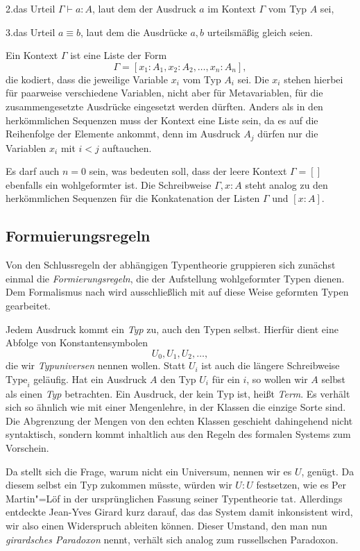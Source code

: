 2.\;das Urteil $\Gamma\vdash a\colon A$, laut dem der Ausdruck
$a$ im Kontext $\Gamma$ vom Typ $A$ sei,

3.\;das Urteil $a\equiv b$, laut dem die Ausdrücke
$a,b$ urteilsmäßig gleich seien.

Ein Kontext $\Gamma$ ist eine Liste der Form
\[\Gamma = [x_1\colon A_1,x_2\colon A_2,\ldots,x_n\colon A_n],\]
die kodiert, dass die jeweilige Variable $x_i$ vom Typ $A_i$ sei. Die $x_i$
stehen hierbei für paarweise verschiedene Variablen, nicht aber für
Metavariablen, für die zusammengesetzte Ausdrücke eingesetzt werden
dürften. Anders als in den herkömmlichen Sequenzen muss der Kontext
eine Liste sein, da es auf die Reihenfolge der Elemente ankommt, denn
im Ausdruck $A_j$ dürfen nur die Variablen $x_i$ mit $i<j$ auftauchen.

Es darf auch $n=0$ sein, was bedeuten soll, dass der leere Kontext
$\Gamma=[]$ ebenfalls ein wohlgeformter ist. Die Schreibweise
$\Gamma,x\colon A$ steht analog zu den herkömmlichen Sequenzen für die
Konkatenation der Listen $\Gamma$ und $[x\colon A]$.

\subsection{Formuierungsregeln}

Von den Schlussregeln der abhängigen Typentheorie gruppieren sich
zunächst einmal die \emph{Formierungsregeln}, die der Aufstellung
wohlgeformter Typen dienen. Dem Formalismus nach wird ausschließlich
mit auf diese Weise geformten Typen gearbeitet.

Jedem Ausdruck kommt ein \emph{Typ} zu, auch den Typen selbst. Hierfür
dient eine Abfolge von Konstantensymbolen
\[U_0,U_1,U_2,\ldots,\]
die wir \emph{Typuniversen} nennen wollen. Statt $U_i$ ist auch die
längere Schreibweise $\mathrm{Type}_i$ geläufig. Hat ein Ausdruck $A$ den
Typ $U_i$ für ein $i$, so wollen wir $A$ selbst als einen \emph{Typ}
betrachten. Ein Ausdruck, der kein Typ ist, heißt \emph{Term}.
Es verhält sich so ähnlich wie mit einer Mengenlehre, in der Klassen
die einzige Sorte sind. Die Abgrenzung der Mengen von den echten Klassen
geschieht dahingehend nicht syntaktisch, sondern kommt inhaltlich aus
den Regeln des formalen Systems zum Vorschein.

Da stellt sich die Frage, warum nicht ein Universum, nennen wir es $U$,
genügt. Da diesem selbst ein Typ zukommen müsste, würden wir $U\colon U$
festsetzen, wie es Per Martin"=Löf in der ursprünglichen Fassung seiner
Typentheorie tat. Allerdings entdeckte Jean-Yves Girard kurz darauf, das
das System damit inkonsistent wird, wir also einen Widerspruch ableiten
können. Dieser Umstand, den man nun \emph{girardsches Paradoxon}
nennt, verhält sich analog zum russellschen Paradoxon.
\cite{Coquand-Type-Theory}

